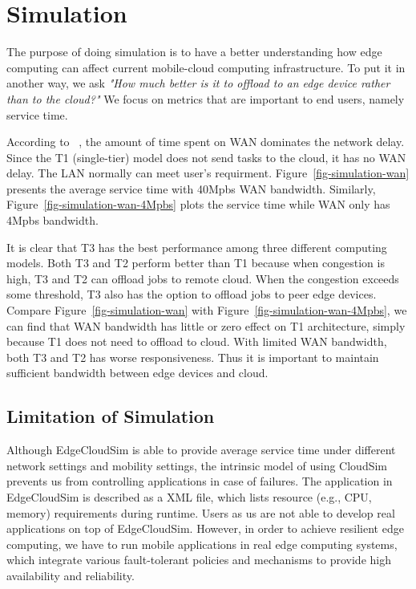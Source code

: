 \section{Simulation}
\label{sec:simulation}

The purpose of doing simulation is to have a better understanding how edge computing can
affect current mobile-cloud computing infrastructure. To put it in another way,
we ask {\em "How much better is it to offload to an edge device rather than to the cloud?"}
We focus on metrics that are important to end users, namely service time.

According to ~\cite{edgecloudsim}, the amount of time spent on WAN dominates the network delay.
Since the T1 (single-tier) model does not send tasks to the cloud, it has no WAN delay. The LAN
normally can meet user's requirment.
Figure~\ref{fig-simulation-wan} presents the average service time with 40Mpbs WAN bandwidth.
Similarly, Figure~\ref{fig-simulation-wan-4Mpbs} plots the service time while WAN only has 4Mpbs bandwidth.

It is clear that T3 has the best performance among three different computing models. Both T3 and T2 perform better
than T1 because when congestion is high, T3 and T2 can offload jobs to remote cloud. When the congestion
exceeds some threshold, T3 also has the option to offload jobs to peer edge devices.
Compare Figure~\ref{fig-simulation-wan} with Figure~\ref{fig-simulation-wan-4Mpbs}, we can find
that WAN bandwidth has little or zero effect on T1 architecture, simply because T1 does not need to offload to cloud.
With limited WAN bandwidth, both T3 and T2 has worse responsiveness. Thus it is important to maintain sufficient
bandwidth between edge devices and cloud.




\subsection{Limitation of Simulation}
Although EdgeCloudSim is able to provide average service time under different network settings and mobility settings,
the intrinsic model of using CloudSim prevents us from controlling applications in case of failures. The application
in EdgeCloudSim is described as a XML file, which lists resource (e.g., CPU, memory) requirements during runtime.
Users as us are not able to develop real applications on top of EdgeCloudSim. However, in order to achieve resilient
edge computing, we have to run mobile applications in real edge computing systems, which integrate various
fault-tolerant policies and mechanisms to provide high availability and reliability.
